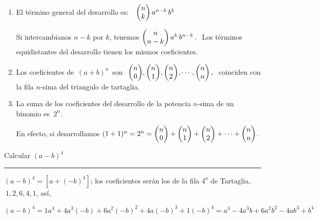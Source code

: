 \vspace{-10mm} %
\begin{theorem}

\begin{enumerate}[1. ]
\item El término general del desarrollo es: $\ \ \mqty(n\\k)\, a^{n-k}\, b^k$

\textcolor{gris}{Si intercambianos $n-k$ por $k$, tenemos $\mqty(n\\n-k)\, a^k\, b^{n-k}\, . \ $ Los términos equidistantes del desarrollo tienen los mismos coeficientes.} 	

\item  Los coeficientes de $\, (a+b)^n \, $ son $\ \mqty(n\\0),\mqty(n\\1), \mqty(n\\2), \cdots , \mqty(n\\n)\, , \ $ coinciden con la fila $n$-sima del triangulo de tartaglia.

\item  La suma de los coeficientes del desarrollo de la potencia $n$-sima de un binomio es $\ 2^n$.

\textcolor{gris}{En efecto, si desarrollamos $(1+1)^n=2^n=\mqty(n\\0)+\mqty(n\\1)+\mqty(n\\2)+ \cdots + \mqty(n\\n)$}.

\end{enumerate}

\end{theorem}

	

\begin{miejercicio}

Calcular $(a-b)^4$

\rule{300pt}{0.1pt}

$(a-b)^4=[a+(-b)^4]$; los coeficientes serán los de la fila $4^a$ de Tartaglia, $\ 1,2,6,4,1$, así,

\vspace{2mm}$(a-b)^4=1a^4+4a^3(-b)+6a^2(-b)^2+4a(-b)^3+1(-b)^4=a^4-4a^3b+6a^2b^2-4ab^3+b^4$
	
\end{miejercicio}



